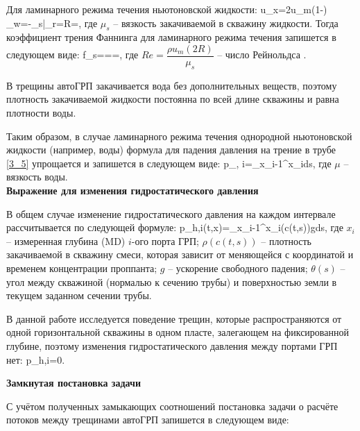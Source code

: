 Для ламинарного режима течения ньютоновской жидкости:
\beq
u_x=2u_m\left(1-\right)\,\,\,\,\,\,\tau_w=-\mu_s\bigg|_{r=R}=,
\eeq
где $\mu_s$ -- вязкость закачиваемой в скважину жидкости.\newline
Тогда коэффициент трения Фаннинга для ламинарного режима течения запишется в следующем виде:
\beq
f_s===,
\eeq
где $Re=\dfrac{\rho u_m\left(2R\right)}{\mu_s}$ -- число Рейнольдса \cite{reynolds}.

В трещины автоГРП закачивается вода без дополнительных веществ, поэтому плотность закачиваемой жидкости постоянна по всей длине скважины и равна плотности воды.

Таким образом, в случае ламинарного режима течения однородной ньютоновской жидкости (например, воды) формула для падения давления на трение в трубе \eqref{3_5} упрощается и запишется в следующем виде:
\beq
\Delta p_{, i}=\int\limits_{x_{i-1}}^{x_i}{}ds,
\eeq
где $\mu$ -- вязкость воды.
\\

\textbf{Выражение для изменения гидростатического давления}

В общем случае изменение гидростатического давления на каждом интервале рассчитывается по следующей формуле:
\beq
\Delta p_{h,i}(t,x)=\int\limits_{x_{i-1}}^{x_i}{\rho(c(t,s))\cdot g\cdot {}ds},
\eeq
где
$x_i$ -- измеренная глубина (MD) $i$-ого порта ГРП;\newline
$\rho(c(t,s))$ -- плотность закачиваемой в скважину смеси, которая зависит от меняющейся с координатой и временем концентрации проппанта;\newline
$g$ -- ускорение свободного падения;
$\theta(s)$ -- угол между скважиной (нормалью к сечению трубы) и поверхностью земли в текущем заданном сечении трубы.

В данной работе исследуется поведение трещин, которые распространяются от одной горизонтальной скважины в одном пласте, залегающем на фиксированной глубине, поэтому изменения гидростатического давления между портами ГРП нет:
\beq
\Delta p_{h,i}=0.
\eeq

\textbf{Замкнутая постановка задачи}

С учётом полученных замыкающих соотношений постановка задачи о расчёте потоков между трещинами автоГРП запишется в следующем виде:

